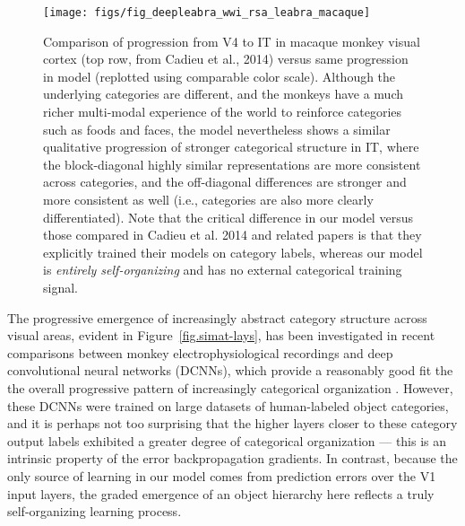 \documentclass[11pt,twoside]{article}
\newif\myifpdf
\begin{document}
\begin{figure}
  \centering\texttt{[image: figs/fig\_deepleabra\_wwi\_rsa\_leabra\_macaque]}
  \caption{\footnotesize Comparison of progression from V4 to IT in macaque monkey visual cortex (top row, from Cadieu et al., 2014) versus same progression in model (replotted using comparable color scale).  Although the underlying categories are different, and the monkeys have a much richer multi-modal experience of the world to reinforce categories such as foods and faces, the model nevertheless shows a similar qualitative progression of stronger categorical structure in IT, where the block-diagonal highly similar representations are more consistent across categories, and the off-diagonal differences are stronger and more consistent as well (i.e., categories are also more clearly differentiated).  Note that the critical difference in our model versus those compared in Cadieu et al. 2014 and related papers is that they explicitly trained their models on category labels, whereas our model is \emph{entirely self-organizing} and has no external categorical training signal.}
  \label{fig.macaque}
\end{figure}

The progressive emergence of increasingly abstract category structure across visual areas, evident in Figure~\ref{fig.simat-lays}, has been investigated in recent comparisons between monkey electrophysiological recordings and deep convolutional neural networks (DCNNs), which provide a reasonably good fit the the overall progressive pattern of increasingly categorical organization \citep{CadieuHongYaminsEtAl14}.  However, these DCNNs were trained on large datasets of human-labeled object categories, and it is perhaps not too surprising that the higher layers closer to these category output labels exhibited a greater degree of categorical organization --- this is an intrinsic property of the error backpropagation gradients.  In contrast, because the only source of learning in our model comes from prediction errors over the V1 input layers, the graded emergence of an object hierarchy here reflects a truly self-organizing learning process.
\end{document}
